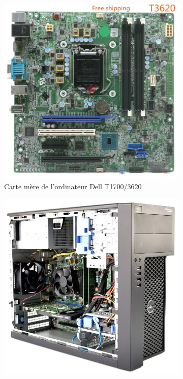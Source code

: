 \begin{figure}[h]
    \begin{subfigure}[t]{0.47\textwidth}
        \centering
        \includegraphics[width=\textwidth]{TP_2-Images_ordinateurs/dell_precision_tower_3620/precision_tower_3620-motherboard-aliexpress.jpg}
        \caption{Carte mère de l'ordinateur Dell T1700/3620}
        \label{fig:carte-mere-dell}
    \end{subfigure}
    \begin{subfigure}[t]{0.47\textwidth}
        \centering
        \includegraphics[width=\textwidth]{TP_2-Images_ordinateurs/dell_precision_tower_3620/precision_tower_3620-overview-mdm_komputery.jpg}

\end{subfigure}
\end{figure}
